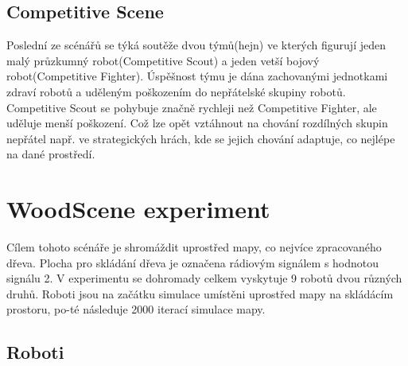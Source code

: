 \subsection{Competitive Scene}
Poslední ze scénářů se týká soutěže dvou týmů(hejn) ve kterých figurují jeden malý průzkumný robot(Competitive Scout) a jeden vetší bojový robot(Competitive Fighter). Úspěšnost týmu je dána zachovanými jednotkami zdraví robotů a uděleným poškozením do nepřátelské skupiny robotů. Competitive Scout se pohybuje značně rychleji než Competitive Fighter, ale uděluje menší poškození. Což lze opět vztáhnout na chování rozdílných skupin nepřátel např. ve strategických hrách, kde se jejich chování adaptuje, co nejlépe na dané prostředí. 

\section{WoodScene experiment}
Cílem tohoto scénáře je shromáždit uprostřed mapy, co nejvíce zpracovaného dřeva. Plocha pro skládání dřeva je označena rádiovým signálem s hodnotou signálu 2. V experimentu se dohromady celkem vyskytuje 9 robotů dvou různých druhů. Roboti jsou na začátku simulace umístěni uprostřed mapy na skládácím prostoru, po-té následuje 2000 iterací simulace mapy. 

\subsection{Roboti}


